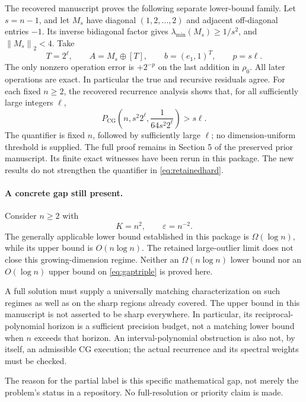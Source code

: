 \documentclass[11pt]{article}
\theoremstyle{remark}\newtheorem{remark}[theorem]{Remark}
\newcommand{\norm}[1]{\left\lVert#1\right\rVert_2}
\newcommand{\PCG}{P_{\mathrm{CG}}}
\newcommand{\eps}{\varepsilon}
\begin{document}
The recovered manuscript proves the following separate lower-bound
family. Let $s=n-1$, and let $M_s$ have diagonal $(1,2,\ldots,2)$ and
adjacent off-diagonal entries $-1$. Its inverse bidiagonal factor gives
$\lambda_{\min}(M_s)\ge1/s^2$, and $\norm{M_s}<4$.
Take
\[
T=2^\ell,\qquad A=M_s\oplus[T],\qquad b=(e_1,1)^T,
\qquad p=s\ell.
\]
The only nonzero operation error is $+2^{-p}$ on the last addition in
$\rho_0$. All later operations are exact. In particular the true and
recursive residuals agree. For each fixed $n\ge2$, the recovered
recurrence analysis shows that, for all sufficiently large integers
$\ell$,
\begin{equation}\label{eq:retainedhard}
\PCG\!\left(n,s^2 2^\ell,\frac1{64s^2 2^\ell}\right)>s\ell.
\end{equation}
The quantifier is fixed $n$, followed by sufficiently large $\ell$;
no dimension-uniform threshold is supplied. The full proof remains in
Section 5 of the preserved prior manuscript. Its finite exact witnesses
have been rerun in this package. The new results do not strengthen the
quantifier in \eqref{eq:retainedhard}.

\paragraph{A concrete gap still present.}
Consider $n\ge2$ with
\begin{equation}\label{eq:gaptriple}
K=n^2,\qquad\eps=n^{-2}.
\end{equation}
The generally applicable lower bound established in this package is
$\Omega(\log n)$, while its upper bound is $O(n\log n)$.
The retained large-outlier limit does not close this growing-dimension
regime. Neither an $\Omega(n\log n)$ lower bound nor an
$O(\log n)$ upper bound on \eqref{eq:gaptriple} is proved here.

A full solution must supply a universally matching characterization on
such regimes as well as on the sharp regions already covered. The
upper bound in this manuscript is not asserted to be sharp everywhere.
In particular, its reciprocal-polynomial horizon is a sufficient
precision budget, not a matching lower bound when $n$ exceeds that
horizon. An interval-polynomial obstruction is also not, by itself, an
admissible CG execution; the actual recurrence and its spectral weights
must be checked.

The reason for the partial label is this specific mathematical gap,
not merely the problem's status in a repository. No full-resolution or
priority claim is made.
\end{document}
